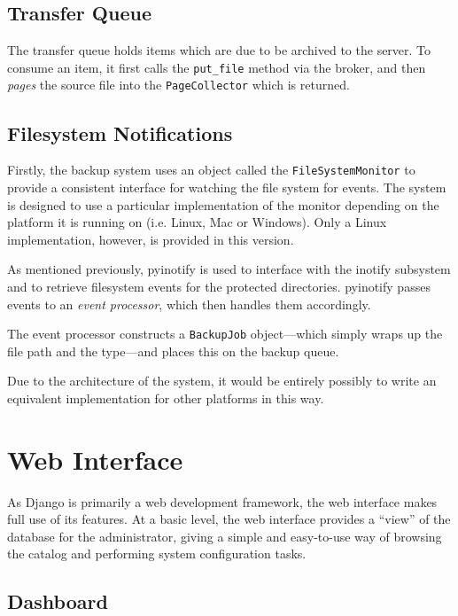 \subsection{Transfer Queue}
\label{sec:implementation-client-transferqueue}

The transfer queue holds items which are due to be archived to the server. To
consume an item, it first calls the \verb!put_file! method via the broker, and
then \emph{pages} the source file into the \verb!PageCollector! which is
returned.

\subsection{Filesystem Notifications}
\label{sec:implementation-client-fsnotify}

Firstly, the backup system uses an object called the \verb!FileSystemMonitor!
to provide a consistent interface for watching the file system for events. The
system is designed to use a particular implementation of the monitor depending
on the platform it is running on (i.e. Linux, Mac or Windows). Only a Linux
implementation, however, is provided in this version.

As mentioned previously, pyinotify is used to interface with the inotify
subsystem and to retrieve filesystem events for the protected directories.
pyinotify passes events to an \emph{event processor}, which then handles them
accordingly.

The event processor constructs a \verb!BackupJob! object---which simply wraps
up the file path and the type---and places this on the backup queue.

Due to the architecture of the system, it would be entirely possibly to write
an equivalent implementation for other platforms in this way.

\section{Web Interface}
\label{sec:implementation-web}

As Django is primarily a web development framework, the web interface makes
full use of its features. At a basic level, the web interface provides
a ``view'' of the database for the administrator, giving a simple and
easy-to-use way of browsing the catalog and performing system configuration
tasks.

\subsection{Dashboard}

